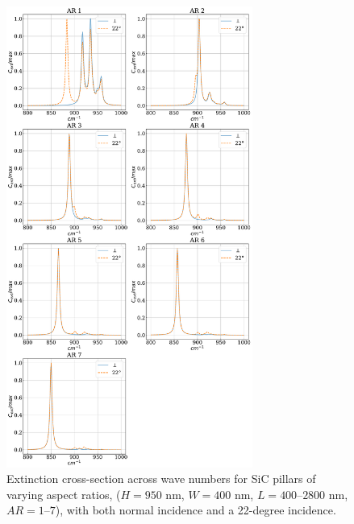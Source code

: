 \begin{figure}
    \centering
    \includegraphics[width=0.72\textwidth]{AR_22_vs_norm.pdf} 
    \caption{Extinction cross-section across wave numbers for SiC pillars of varying aspect ratios,  
             ($H=950$ nm, $W=400$ nm, $L=400$--$2800$ nm, $AR=1$--$7$), with both normal incidence and a 
             22-degree incidence.}
    \label{fig:AR_22_vs_norm}
\end{figure}

